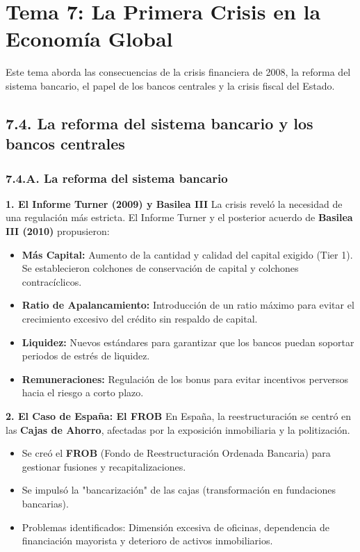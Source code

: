 \documentclass[a4paper,12pt]{report}
\theoremstyle{ejerciciostyle}
\newcommand{\nota}[2]{
    \begin{tcolorbox}[colframe=corporateblue, colback=corporatebg, title=\textbf{#1}]
        #2
    \end{tcolorbox}
}
\begin{document}
\newpage

\chapter{Tema 7: La Primera Crisis en la Economía Global}

\nota{Introducción}{
Este tema aborda las consecuencias de la crisis financiera de 2008, la reforma del sistema bancario, el papel de los bancos centrales y la crisis fiscal del Estado.
}

\section{7.4. La reforma del sistema bancario y los bancos centrales}

\subsection{7.4.A. La reforma del sistema bancario}

\textbf{1. El Informe Turner (2009) y Basilea III}
La crisis reveló la necesidad de una regulación más estricta. El Informe Turner y el posterior acuerdo de \textbf{Basilea III (2010)} propusieron:
\begin{itemize}
    \item \textbf{Más Capital:} Aumento de la cantidad y calidad del capital exigido (Tier 1). Se establecieron colchones de conservación de capital y colchones contracíclicos.
    \item \textbf{Ratio de Apalancamiento:} Introducción de un ratio máximo para evitar el crecimiento excesivo del crédito sin respaldo de capital.
    \item \textbf{Liquidez:} Nuevos estándares para garantizar que los bancos puedan soportar periodos de estrés de liquidez.
    \item \textbf{Remuneraciones:} Regulación de los bonus para evitar incentivos perversos hacia el riesgo a corto plazo.
\end{itemize}

\textbf{2. El Caso de España: El FROB}
En España, la reestructuración se centró en las \textbf{Cajas de Ahorro}, afectadas por la exposición inmobiliaria y la politización.
\begin{itemize}
    \item Se creó el \textbf{FROB} (Fondo de Reestructuración Ordenada Bancaria) para gestionar fusiones y recapitalizaciones.
    \item Se impulsó la "bancarización" de las cajas (transformación en fundaciones bancarias).
    \item Problemas identificados: Dimensión excesiva de oficinas, dependencia de financiación mayorista y deterioro de activos inmobiliarios.
\end{itemize}
\end{document}
